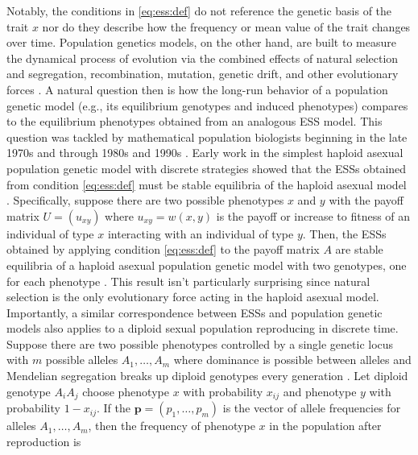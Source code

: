 \documentclass[11pt]{article}
\newcommand{\w}{w}
\renewcommand{\vec}[1]{\symbf{#1}}
\begin{document}
Notably, the conditions in \eqref{eq:ess:def} do not reference the genetic basis of the trait $x$ nor do they describe how the frequency or mean value of the trait changes over time. Population genetics models, on the other hand, are built to measure the dynamical process of evolution via the combined effects of natural selection and segregation, recombination, mutation, genetic drift, and other evolutionary forces \cite{Crow:Kimura:1970,Ewens:2004}. A natural question then is how the long-run behavior of a population genetic model (e.g., its equilibrium genotypes and induced phenotypes) compares to the equilibrium phenotypes obtained from an analogous ESS model. This question was tackled by mathematical population biologists beginning in the late 1970s and through 1980s and 1990s \cite[e..g,][]{Taylor:Jonker:1978,Hofbauer:Schuster:1979,Zeeman:1980,Eshel:1982,Hofbauer:Schuster:1982,Lessard:1984,Cressman:1988,Cressman:Hines:1984,Cressman:Hofbauer:1996,Hammerstein:1996,Weissing:1996,Eshel:1996,Eshel:Feldman:1984}. Early work in the simplest haploid asexual population genetic model with discrete strategies showed that the ESSs obtained from condition \eqref{eq:ess:def} must be stable equilibria of the haploid asexual model \cite{Taylor:Jonker:1978,Hofbauer:Schuster:1979,Zeeman:1980}. Specifically, suppose there are two possible phenotypes $x$ and $y$ with the payoff matrix $U = (u_{xy})$ where $u_{xy} = \w(x,y)$ is the payoff or increase to fitness of an individual of type $x$ interacting with an individual of type $y$. Then, the ESSs obtained by applying condition \eqref{eq:ess:def} to the payoff matrix $A$ are stable equilibria of a haploid asexual population genetic model with two genotypes, one for each phenotype \cite{Taylor:Jonker:1978,Hofbauer:Schuster:1979,Zeeman:1980,Hofbauer:Sigmund:1998}. This result isn't particularly surprising since natural selection is the only evolutionary force acting in the haploid asexual model. Importantly, a similar  correspondence between ESSs and population genetic models also applies to a diploid sexual population reproducing in discrete time. Suppose there are two possible phenotypes controlled by a single genetic locus with $m$ possible alleles $A_{1},\ldots,A_{m}$ where dominance is possible between alleles and Mendelian segregation breaks up diploid genotypes every generation \cite{Eshel:1982,Lessard:1984}. Let diploid genotype $A_{i} A_{j}$ choose phenotype $x$ with probability $x_{ij}$ and phenotype $y$ with probability $1-x_{ij}$. If the $\vec{p} = (p_{1}, \ldots, p_{m})$ is the vector of allele frequencies for alleles $A_{1},\ldots,A_{m}$, then the frequency of phenotype $x$ in the population after reproduction is
\end{document}
